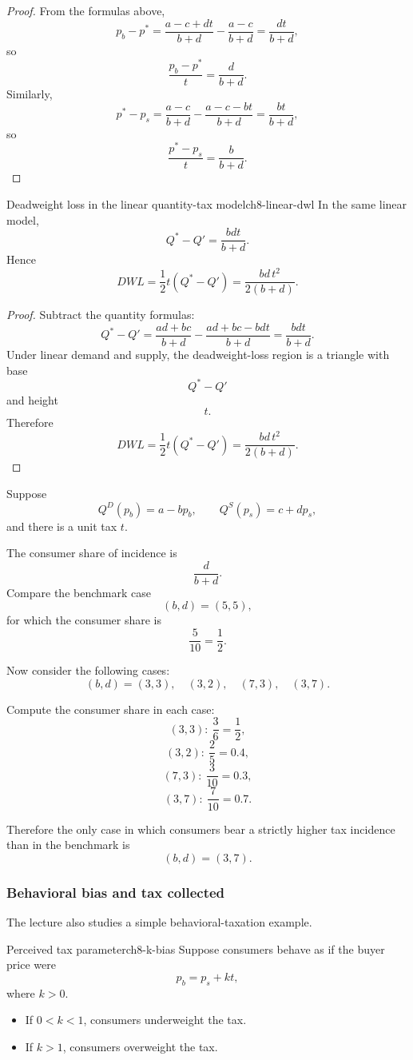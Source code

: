 \begin{proof}
From the formulas above,
\[
p_b-p^*
=
\frac{a-c+dt}{b+d}-\frac{a-c}{b+d}
=
\frac{dt}{b+d},
\]
so
\[
\frac{p_b-p^*}{t}=\frac{d}{b+d}.
\]
Similarly,
\[
p^*-p_s
=
\frac{a-c}{b+d}-\frac{a-c-bt}{b+d}
=
\frac{bt}{b+d},
\]
so
\[
\frac{p^*-p_s}{t}=\frac{b}{b+d}.
\]
\end{proof}

\begin{theorem}{Deadweight loss in the linear quantity-tax model}{ch8-linear-dwl}
In the same linear model,
\[
Q^*-Q'
=
\frac{bdt}{b+d}.
\]
Hence
\[
DWL
=
\frac12 t(Q^*-Q')
=
\frac{bd\,t^2}{2(b+d)}.
\]
\end{theorem}

\begin{proof}
Subtract the quantity formulas:
\[
Q^*-Q'
=
\frac{ad+bc}{b+d} - \frac{ad+bc-bdt}{b+d}
=
\frac{bdt}{b+d}.
\]
Under linear demand and supply, the deadweight-loss region is a triangle with base
\[
Q^*-Q'
\]
and height
\[
t.
\]
Therefore
\[
DWL=\frac12 t(Q^*-Q')=\frac{bd\,t^2}{2(b+d)}.
\]
\end{proof}

\begin{examplebox}[title={Worked Example: comparative statics of tax incidence}]
Suppose
\[
Q^D(p_b)=a-bp_b,
\qquad
Q^S(p_s)=c+dp_s,
\]
and there is a unit tax $t$.

The consumer share of incidence is
\[
\frac{d}{b+d}.
\]
Compare the benchmark case
\[
(b,d)=(5,5),
\]
for which the consumer share is
\[
\frac{5}{10}=\frac12.
\]

Now consider the following cases:
\[
(b,d)=(3,3), \quad (3,2), \quad (7,3), \quad (3,7).
\]

Compute the consumer share in each case:
\[
(3,3):\ \frac{3}{6}=\frac12,
\]
\[
(3,2):\ \frac{2}{5}=0.4,
\]
\[
(7,3):\ \frac{3}{10}=0.3,
\]
\[
(3,7):\ \frac{7}{10}=0.7.
\]

Therefore the only case in which consumers bear a strictly higher tax incidence than in the benchmark is
\[
\boxed{(b,d)=(3,7).}
\]
\end{examplebox}

\subsubsection{Behavioral bias and tax collected}

The lecture also studies a simple behavioral-taxation example.

\begin{definition}{Perceived tax parameter}{ch8-k-bias}
Suppose consumers behave as if the buyer price were
\[
p_b=p_s+kt,
\]
where $k>0$.
\begin{itemize}
    \item If $0<k<1$, consumers underweight the tax.
    \item If $k>1$, consumers overweight the tax.
\end{itemize}
\end{definition}

